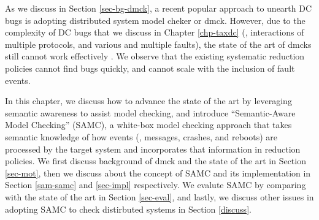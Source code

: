 
As we discuss in Section \ref{sec-bg-dmck}, a recent popular approach to unearth
DC bugs is adopting distributed system model cheker or dmck. However, due to the
complexity of DC bugs that we discuss in Chapter \ref{chp-taxdc} (\eg,
interactions of multiple protocols, and various and multiple faults), the state
of the art of dmcks still cannot work effectively \cite{Guo+11-Demeter,
Killian+07-LifeDeathMaceMC, Simsa+10-Dbug, Yang+09-Modist}.  We observe that
the existing systematic reduction policies cannot find bugs quickly, and cannot
scale with the inclusion of fault events.

In this chapter, we discuss how to advance the state of the art by leveraging
semantic awareness to assist model checking, and introduce ``Semantic-Aware
Model Checking'' (SAMC), a white-box model checking approach that takes semantic
knowledge of how events (\eg, messages, crashes, and reboots) are processed by
the target system and incorporates that information in reduction policies. We
first discuss background of dmck and the state of the art in Section \ref{sec-mot},
then we discuss about the concept of SAMC and its implementation in Section
\ref{sam-samc} and \ref{sec-impl} respectively. We evalute SAMC by comparing with the
state of the art in Section \ref{sec-eval}, and lastly, we discuss other issues in
adopting SAMC to check distirbuted systems in Section \ref{discuss}.


